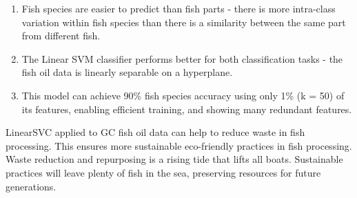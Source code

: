\documentclass[runningheads]{llncs}
\begin{document}
\begin{enumerate}
  \item Fish species are easier to predict than fish parts - there is more intra-class variation within fish species than there is a similarity between the same part from different fish.
  \item The Linear SVM classifier performs better for both classification tasks - the fish oil data is linearly separable on a hyperplane.
  \item This model can achieve 90\% fish species accuracy using only 1\% (k = 50) of its features, enabling efficient training, and showing many redundant features. 
\end{enumerate}

LinearSVC applied to GC fish oil data can help to reduce waste in fish processing. 
This ensures more sustainable eco-friendly practices in fish processing.
Waste reduction and repurposing is a rising tide that lifts all boats.
Sustainable practices will leave plenty of fish in the sea, preserving resources for future generations. 





\end{document}
